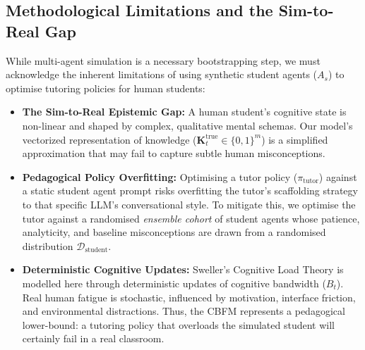 \subsection{Methodological Limitations and the Sim-to-Real Gap}
While multi-agent simulation is a necessary bootstrapping step, we must acknowledge the inherent limitations of using synthetic student agents ($A_s$) to optimise tutoring policies for human students:
\begin{itemize}
    \item \textbf{The Sim-to-Real Epistemic Gap:} A human student's cognitive state is non-linear and shaped by complex, qualitative mental schemas. Our model's vectorized representation of knowledge ($\mathbf{K}^{\text{true}}_t \in \{0, 1\}^m$) is a simplified approximation that may fail to capture subtle human misconceptions.
    \item \textbf{Pedagogical Policy Overfitting:} Optimising a tutor policy ($\pi_{\text{tutor}}$) against a static student agent prompt risks overfitting the tutor's scaffolding strategy to that specific LLM's conversational style. To mitigate this, we optimise the tutor against a randomised \textit{ensemble cohort} of student agents whose patience, analyticity, and baseline misconceptions are drawn from a randomised distribution $\mathcal{D}_{\text{student}}$.
    \item \textbf{Deterministic Cognitive Updates:} Sweller's Cognitive Load Theory is modelled here through deterministic updates of cognitive bandwidth ($B_t$). Real human fatigue is stochastic, influenced by motivation, interface friction, and environmental distractions. Thus, the CBFM represents a pedagogical lower-bound: a tutoring policy that overloads the simulated student will certainly fail in a real classroom.
\end{itemize}
